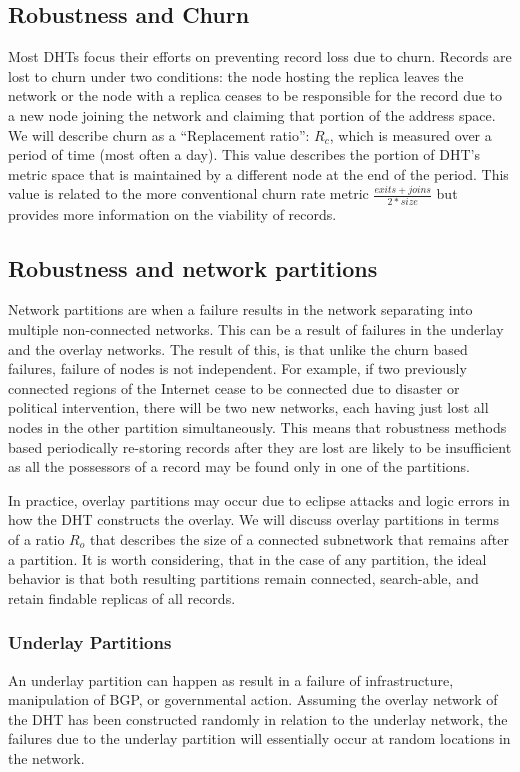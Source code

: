 \subsection{Robustness and Churn}
Most DHTs focus their efforts on preventing record loss due to churn.
Records are lost to churn under two conditions: the node hosting the replica leaves the network or the node with a replica ceases to be responsible for the record due to a new node joining the network and claiming that portion of the address space. 
We will describe churn as a ``Replacement ratio'': $R_{c}$, which is measured over a period of time (most often a day).
This value describes the portion of DHT's metric space that is maintained by a different node at the end of the period.
This value is related to the more conventional churn rate metric $\frac{exits + joins}{2*size}$ but provides more information on the viability of records.

\subsection{Robustness and network partitions}
Network partitions are when a failure results in the network separating into multiple non-connected networks.
This can be a result of failures in the underlay and the overlay networks.
The result of this, is that unlike the churn based failures, failure of nodes is not independent.
For example, if two previously connected regions of the Internet cease to be connected due to disaster or political intervention, there will be two new networks, each having just lost all nodes in the other partition simultaneously.
This means that robustness methods based periodically re-storing records after they are lost are likely to be insufficient as all the possessors of a record may be found only in one of the partitions.

In practice, overlay partitions may occur due to eclipse attacks and logic errors in how the DHT constructs the overlay.
We will discuss overlay partitions in terms of a ratio $R_{o}$ that describes the size of a connected subnetwork that remains after a partition.
It is worth considering, that in the case of any partition, the ideal behavior is that both resulting partitions remain connected, search-able, and retain findable replicas of all records.


\subsubsection{Underlay Partitions}
An underlay partition can happen as result in a failure of infrastructure, manipulation of BGP, or governmental action.
Assuming the overlay network of the DHT has been constructed randomly in relation to the underlay network, the failures due to the underlay partition will essentially occur at random locations in the network. 

